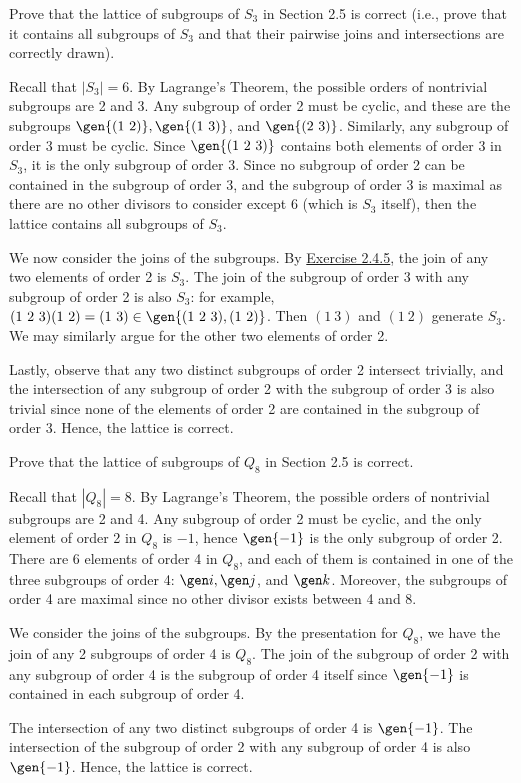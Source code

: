 \begin{exercise}\label{ex3.2.2}
    Prove that the lattice of subgroups of $S_3$ in Section 2.5 is correct (i.e., prove that it contains all subgroups of $S_3$ and that their pairwise joins and intersections are correctly drawn).
\end{exercise}
\begin{sol}
    Recall that $|S_3| = 6$. By Lagrange's Theorem, the possible orders of nontrivial subgroups are 2 and 3. Any subgroup of order 2 must be cyclic, and these are the subgroups $\gen{(1\ 2)}, \gen{(1\ 3)}$, and $\gen{(2\ 3)}$. Similarly, any subgroup of order 3 must be cyclic. Since $\gen{(1\ 2\ 3)}$ contains both elements of order 3 in $S_3$, it is the only subgroup of order 3. Since no subgroup of order 2 can be contained in the subgroup of order 3, and the subgroup of order 3 is maximal as there are no other divisors to consider except 6 (which is $S_3$ itself), then the lattice contains all subgroups of $S_3$.

    We now consider the joins of the subgroups. By \hyperref[ex2.4.5]{Exercise 2.4.5}, the join of any two elements of order 2 is $S_3$. The join of the subgroup of order 3 with any subgroup of order 2 is also $S_3$: for example, $(1\ 2\ 3)(1\ 2) = (1\ 3) \in \gen{(1\ 2\ 3), (1\ 2)}$. Then $(1\ 3)$ and $(1\ 2)$ generate $S_3$. We may similarly argue for the other two elements of order 2.

    Lastly, observe that any two distinct subgroups of order 2 intersect trivially, and the intersection of any subgroup of order 2 with the subgroup of order 3 is also trivial since none of the elements of order 2 are contained in the subgroup of order 3. Hence, the lattice is correct.
\end{sol}

\begin{exercise}\label{ex3.2.3}
    Prove that the lattice of subgroups of $Q_8$ in Section 2.5 is correct.
\end{exercise}

\begin{sol}
    Recall that $|Q_8| = 8$. By Lagrange's Theorem, the possible orders of nontrivial subgroups are 2 and 4. Any subgroup of order 2 must be cyclic, and the only element of order 2 in $Q_8$ is $-1$, hence $\gen{-1}$ is the only subgroup of order 2. There are 6 elements of order 4 in $Q_8$, and each of them is contained in one of the three subgroups of order 4: $\gen i, \gen j$, and $\gen k$. Moreover, the subgroups of order 4 are maximal since no other divisor exists between 4 and 8.

    We consider the joins of the subgroups. By the presentation for $Q_8$, we have the join of any 2 subgroups of order 4 is $Q_8$. The join of the subgroup of order 2 with any subgroup of order 4 is the subgroup of order 4 itself since $\gen{-1}$ is contained in each subgroup of order 4.

    The intersection of any two distinct subgroups of order 4 is $\gen{-1}$. The intersection of the subgroup of order 2 with any subgroup of order 4 is also $\gen{-1}$. Hence, the lattice is correct.
\end{sol}

